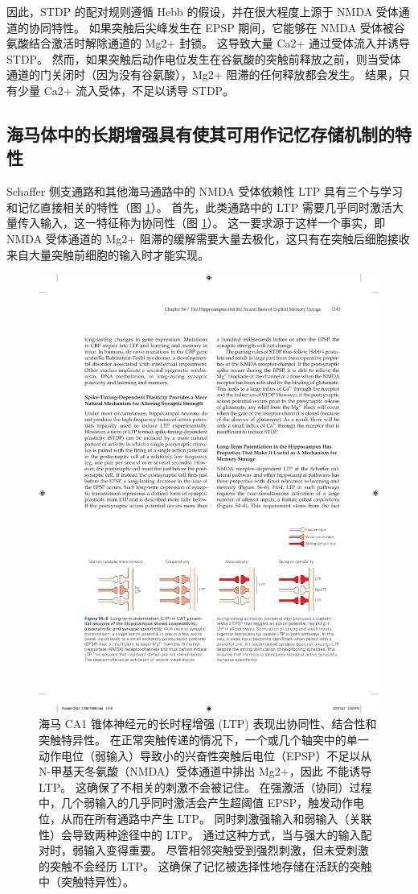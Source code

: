因此，STDP 的配对规则遵循 Hebb 的假设，并在很大程度上源于 NMDA 受体通道的协同特性。 如果突触后尖峰发生在 EPSP 期间，它能够在 NMDA 受体被谷氨酸结合激活时解除通道的 Mg2+ 封锁。 这导致大量 Ca2+ 通过受体流入并诱导 STDP。 然而，如果突触后动作电位发生在谷氨酸的突触前释放之前，则当受体通道的门关闭时（因为没有谷氨酸），Mg2+ 阻滞的任何释放都会发生。 结果，只有少量 Ca2+ 流入受体，不足以诱导 STDP。

\subsection{海马体中的长期增强具有使其可用作记忆存储机制的特性}
Schaffer 侧支通路和其他海马通路中的 NMDA 受体依赖性 LTP 具有三个与学习和记忆直接相关的特性（图 \ref{fig:54_6}）。 
首先，此类通路中的 LTP 需要几乎同时激活大量传入输入，这一特征称为协同性（图 \ref{fig:54_6}）。 这一要求源于这样一个事实，即 NMDA 受体通道的 Mg2+ 阻滞的缓解需要大量去极化，这只有在突触后细胞接收来自大量突触前细胞的输入时才能实现。

\begin{figure}[htbp]
	\centering
	\includegraphics[width=0.9\linewidth]{chap54/fig_54_6}
	\caption{海马 CA1 锥体神经元的长时程增强 (LTP) 表现出协同性、结合性和突触特异性。 在正常突触传递的情况下，一个或几个轴突中的单一动作电位（弱输入）导致小的兴奋性突触后电位（EPSP）不足以从 N-甲基天冬氨酸（NMDA）受体通道中排出 Mg2+，因此 不能诱导 LTP。 这确保了不相关的刺激不会被记住。 在强激活（协同）过程中，几个弱输入的几乎同时激活会产生超阈值 EPSP，触发动作电位，从而在所有通路中产生 LTP。 同时刺激强输入和弱输入（关联性）会导致两种途径中的 LTP。 通过这种方式，当与强大的输入配对时，弱输入变得重要。 尽管相邻突触受到强烈刺激，但未受刺激的突触不会经历 LTP。 这确保了记忆被选择性地存储在活跃的突触中（突触特异性）。}
	\label{fig:54_6}
\end{figure}

